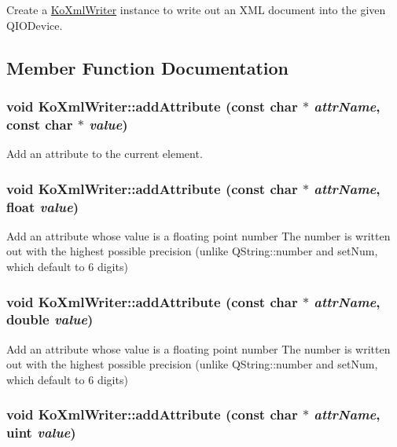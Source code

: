 Create a \hyperlink{classKoXmlWriter}{KoXmlWriter} instance to write out an XML document into the given QIODevice. 

\subsection{Member Function Documentation}
\hypertarget{classKoXmlWriter_920571457da436ac3c6e7f8f0521e48c}{
\subsubsection[{addAttribute}]{\setlength{\rightskip}{0pt plus 5cm}void KoXmlWriter::addAttribute (const char $\ast$ {\em attrName}, \/  const char $\ast$ {\em value})}}
\label{classKoXmlWriter_920571457da436ac3c6e7f8f0521e48c}


Add an attribute to the current element. \hypertarget{classKoXmlWriter_f824c78438951baaad9c79cf7c1267a7}{
\subsubsection[{addAttribute}]{\setlength{\rightskip}{0pt plus 5cm}void KoXmlWriter::addAttribute (const char $\ast$ {\em attrName}, \/  float {\em value})}}
\label{classKoXmlWriter_f824c78438951baaad9c79cf7c1267a7}


Add an attribute whose value is a floating point number The number is written out with the highest possible precision (unlike QString::number and setNum, which default to 6 digits) \hypertarget{classKoXmlWriter_70f154aa14a29bfedc6fc8a8db65274d}{
\subsubsection[{addAttribute}]{\setlength{\rightskip}{0pt plus 5cm}void KoXmlWriter::addAttribute (const char $\ast$ {\em attrName}, \/  double {\em value})}}
\label{classKoXmlWriter_70f154aa14a29bfedc6fc8a8db65274d}


Add an attribute whose value is a floating point number The number is written out with the highest possible precision (unlike QString::number and setNum, which default to 6 digits) \hypertarget{classKoXmlWriter_e3103a2a23b5a037272ccae9a378d5d2}{
\subsubsection[{addAttribute}]{\setlength{\rightskip}{0pt plus 5cm}void KoXmlWriter::addAttribute (const char $\ast$ {\em attrName}, \/  uint {\em value})}}
\label{classKoXmlWriter_e3103a2a23b5a037272ccae9a378d5d2}


